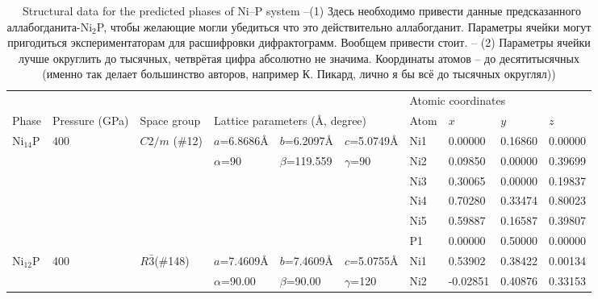 \documentclass[twoside,twocolumn,9pt]{article}
\begin{document}
\begin{table}[t]
\small
  \caption{\ Structural data for the predicted phases of Ni--P system 
–(1) Здесь необходимо привести данные предсказанного аллабогданита-Ni$_2$P, чтобы желающие могли убедиться что это действительно аллабогданит. Параметры ячейки могут пригодиться экспериментаторам для расшифровки дифрактограмм. Вообщем привести стоит.
– (2) Параметры ячейки лучше округлить до тысячных, четврётая цифра абсолютно не значима. Координаты атомов – до десятитысячных (именно так делает большинство авторов, например К. Пикард, лично я бы всё до тысячных округлял)) }
  \label{tbl:new_phases}
  \begin{tabular*}{\textwidth}{@{\extracolsep{\fill}}llllllllll}
    \hline
    \multicolumn{6}{l}{} & \multicolumn{4}{l}{Atomic coordinates}\\\cline{7-10}
    Phase & Pressure (GPa) & Space group & \multicolumn{3}{l}{Lattice parameters (\AA, degree)}  & Atom & $x$ & $y$ & $z$\\
    \midrule
    Ni$_{14}$P & 400 & $C2/m$ (\#12) & $a$=6.8686\AA    & $b$=6.2097\AA   & $c$=5.0749\AA    & Ni1 & 0.00000 & 0.16860 & 0.00000 \\
               &     &               & $\alpha$=90      & $\beta$=119.559 & $\gamma$=90      & Ni2 & 0.09850 & 0.00000 & 0.39699 \\    
               &     &               &                  &                 &                  & Ni3 & 0.30065 & 0.00000 & 0.19837 \\
               &     &               &                  &                 &                  & Ni4 & 0.70280 & 0.33474 & 0.80023 \\
               &     &               &                  &                 &                  & Ni5 & 0.59887 & 0.16587 & 0.39807 \\
               &     &               &                  &                 &                  & P1  & 0.00000 & 0.50000 & 0.00000 \\
\midrule
    Ni$_{12}$P & 400 & $R\bar3$(\#148)    & $a$=7.4609\AA    & $b$=7.4609\AA   & $c$=5.0755\AA    & Ni1 & 0.53902  & 0.38422 & 0.00134 \\
               &     &               & $\alpha$=90.00   & $\beta$=90.00 & $\gamma$=120       & Ni2 & -0.02851 & 0.40876 & 0.33153 \\

\end{tabular*}
\end{table}
\end{document}

